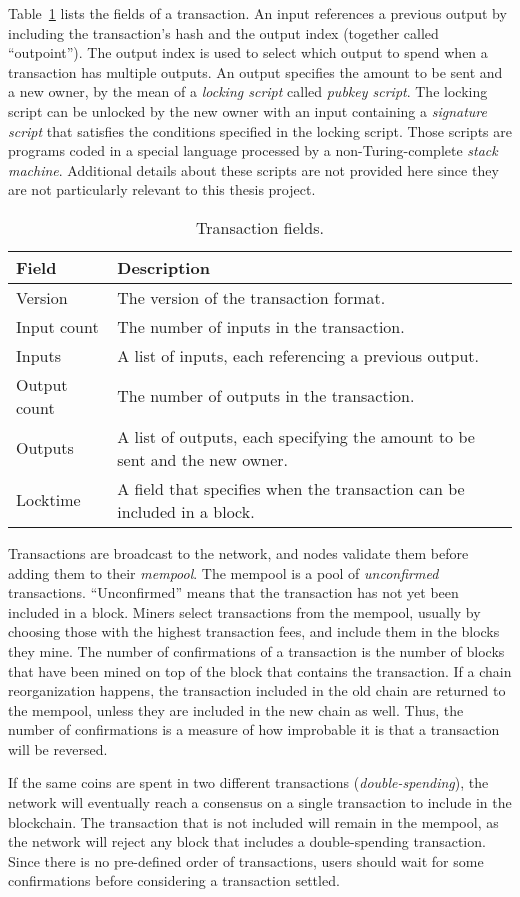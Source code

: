 Table~\ref{tab:tx-fields} lists the fields of a transaction. An input
references a previous output by including the transaction's hash and the output
index (together called ``outpoint''). The output index is used to select which
output to spend when a transaction has multiple outputs. An output specifies
the amount to be sent and a new owner, by the mean of a \emph{locking script}
called \emph{pubkey script}. The locking script can be unlocked by the new
owner with an input containing a \emph{signature script} that satisfies the
conditions specified in the locking script. Those scripts are programs coded in
a special language processed by a non-Turing-complete \emph{stack machine}.
Additional details about these scripts are not provided here since they are not
particularly relevant to this thesis project.

\begin{table}[tbhp]
	\centering
	\begin{tabularx}{\linewidth}{|l|X|}
		\toprule
		\textbf{Field} & \textbf{Description} \\
		\midrule
		Version & The version of the transaction format. \\
		\midrule
		Input count & The number of inputs in the transaction. \\
		\midrule
		Inputs & A list of inputs, each referencing a previous output.
		\\
		\midrule
		Output count & The number of outputs in the transaction. \\
		\midrule
		Outputs & A list of outputs, each specifying the amount to be
		sent and the new owner. \\
		\midrule
		Locktime & A field that specifies when the transaction can be
		included in a block. \\
		\bottomrule
	\end{tabularx}
	\caption{Transaction fields.}\label{tab:tx-fields}
\end{table}

Transactions are broadcast to the network, and nodes validate them before
adding them to their \emph{mempool}. The mempool is a pool of
\emph{unconfirmed} transactions. ``Unconfirmed'' means that the transaction has
not yet been included in a block. Miners select transactions from the mempool,
usually by choosing those with the highest transaction fees, and include them
in the blocks they mine. The number of confirmations of a transaction is the
number of blocks that have been mined on top of the block that contains the
transaction. If a chain reorganization happens, the transaction included in the
old chain are returned to the mempool, unless they are included in the new
chain as well. Thus, the number of confirmations is a measure of how improbable
it is that a transaction will be reversed.

If the same coins are spent in two different transactions
(\emph{double-spending}), the network will eventually reach a consensus on a
single transaction to include in the blockchain. The transaction that is not
included will remain in the mempool, as the network will reject any block that
includes a double-spending transaction. Since there is no pre-defined order of
transactions, users should wait for some confirmations before considering a
transaction settled.
